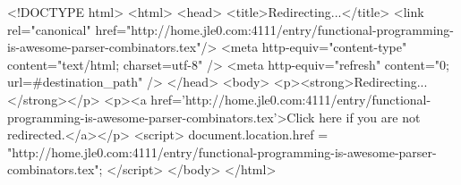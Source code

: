 <!DOCTYPE html>
<html>
<head>
<title>Redirecting...</title>
<link rel="canonical" href="http://home.jle0.com:4111/entry/functional-programming-is-awesome-parser-combinators.tex"/>
<meta http-equiv="content-type" content="text/html; charset=utf-8" />
<meta http-equiv="refresh" content="0; url=#{destination_path}" />
</head>
<body>
  <p><strong>Redirecting...</strong></p>
  <p><a href='http://home.jle0.com:4111/entry/functional-programming-is-awesome-parser-combinators.tex'>Click here if you are not redirected.</a></p>
  <script>
    document.location.href = "http://home.jle0.com:4111/entry/functional-programming-is-awesome-parser-combinators.tex";
  </script>
</body>
</html>
